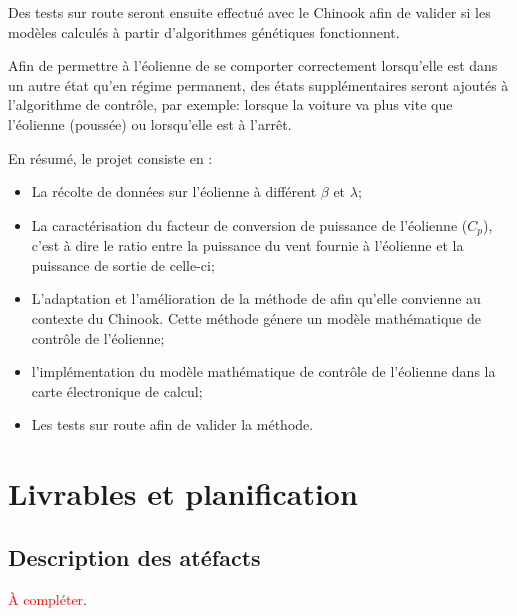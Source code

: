 \documentclass[11pt]{article}
\begin{document}
Des tests sur route seront ensuite effectué avec le Chinook afin de valider si les modèles calculés à partir d'algorithmes génétiques fonctionnent.

Afin de permettre à l'éolienne de se comporter correctement lorsqu'elle est dans un autre état qu'en régime permanent, des états supplémentaires seront ajoutés à l'algorithme de contrôle, par exemple: lorsque la voiture va plus vite que l'éolienne (poussée) ou lorsqu'elle est à l'arrêt.


En résumé, le projet consiste en :
\begin{itemize}
  \item La récolte de données sur l'éolienne à différent $\beta$ et $\lambda$;
  \item La caractérisation du facteur de conversion de puissance de l'éolienne ($C_p$), c'est à dire le ratio entre la puissance du vent fournie à l'éolienne et la puissance de sortie de celle-ci;
  \item L'adaptation et l'amélioration de la méthode de \cite{Ouissam12} afin qu'elle convienne au contexte du Chinook. Cette méthode génere un modèle mathématique de contrôle de l'éolienne;
  \item l'implémentation du modèle mathématique de contrôle de l'éolienne dans la carte électronique de calcul;
  \item Les tests sur route afin de valider la méthode.
\end{itemize}

\section{Livrables et planification}
\subsection{Description des atéfacts}

\textcolor{red}{À compléter}.
\end{document}
